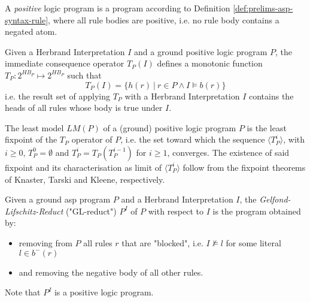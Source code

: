 \begin{definition}
\label{def:prelims-asp-semantics-positive-program}
A \emph{positive} logic program is a program according to Definition \ref{def:prelims-asp-syntax-rule}, where all rule bodies are positive, i.e. no rule body contains a negated atom.
\end{definition}

\begin{definition}
\label{def:prelims-asp-semantics-immediate-consequence}
Given a Herbrand Interpretation $I$ and a ground positive logic program $P$, the immediate  consequence operator $T_P(I)$ defines a monotonic function $T_P: 2^{HB_P} \mapsto 2^{HB_P}$ such that
\[
	T_P(I) = \{h(r)\ |\ r \in P \land I \models b(r)\}
\]
i.e. the result set of applying $T_P$ with a Herbrand Interpretation $I$ contains the heads of all rules whose body is true under $I$.
\end{definition}

\begin{definition}
\label{def:prelims-asp-semantics-least-model}
The least model $LM(P)$ of a (ground) positive logic program $P$ is the least fixpoint of the $T_P$ operator  of $P$, i.e. the set toward which the sequence $\langle T^{i}_{P} \rangle$, with $i \geq 0$, $T^{0}_P = \emptyset$ and $T^{i}_P = T_P(T^{i-1}_P)$ for $i \geq 1$, converges. The existence of said fixpoint and its characterisation as limit of $\langle T^{i}_{P} \rangle$ follow from the fixpoint theorems of Knaster, Tarski and Kleene, respectively.
\end{definition}

\begin{definition}
\label{def:prelims-asp-semantics-gl-reduct}
Given a ground \gls{asp} program $P$ and a Herbrand Interpretation $I$, the \emph{Gelfond-Lifschitz-Reduct} ("GL-reduct") $P^{I}$ of $P$ with respect to $I$ is the program obtained by:
\begin{itemize}
	\item removing from $P$ all rules $r$ that are "blocked", i.e. $I \not\models l$ for some literal $l \in b^{-}(r)$ 
	\item and removing the negative body of all other rules.
\end{itemize}
Note that $P^{I}$ is a positive logic program.
\end{definition}

